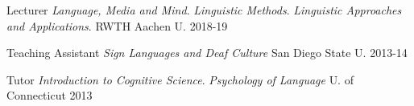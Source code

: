 



\begin{cvhonors}

\iffalse %
\cvhonor
  {Bolded Position}
  {Full Description}
  {Right just Location}
  {YEAR}
\fi

\cvhonor
  {Lecturer}
  {\textit{Language, Media and Mind}. \textit{Linguistic Methods}. \textit{Linguistic Approaches and Applications}.}
  {RWTH Aachen U.}
  {2018-19}

\cvhonor
  {Teaching Assistant}
  {\textit{Sign Languages and Deaf Culture}}
  {San Diego State U.}
  {2013-14}

\cvhonor
  {Tutor}
  {\textit{Introduction to Cognitive Science}. \textit{Psychology of Language}}
  {U. of Connecticut}
  {2013}

\end{cvhonors}